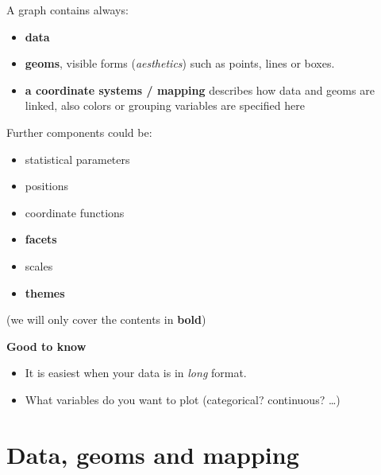 \documentclass[
  letterpaper,
  DIV=11,
  numbers=noendperiod,
  oneside]{scrreprt}
\begin{document}
A graph contains always:

\begin{itemize}
\item
  \textbf{data}
\item
  \textbf{geoms}, visible forms (\emph{aesthetics}) such as points,
  lines or boxes.
\item
  \textbf{a coordinate systems / mapping} describes how data and geoms
  are linked, also colors or grouping variables are specified here
\end{itemize}

Further components could be:

\begin{itemize}
\item
  statistical parameters
\item
  positions
\item
  coordinate functions
\item
  \textbf{facets}
\item
  scales
\item
  \textbf{themes}
\end{itemize}

(we will only cover the contents in \textbf{bold})

\begin{tcolorbox}[enhanced jigsaw, colframe=quarto-callout-tip-color-frame, bottomrule=.15mm, left=2mm, arc=.35mm, toprule=.15mm, opacityback=0, colback=white, rightrule=.15mm, breakable, leftrule=.75mm]
\begin{minipage}[t]{5.5mm}
\textcolor{quarto-callout-tip-color}{\faLightbulb}
\end{minipage}%
\begin{minipage}[t]{\textwidth - 5.5mm}

\textbf{Good to know}\vspace{2mm}

\begin{itemize}
\item
  It is easiest when your data is in \emph{long} format.
\item
  What variables do you want to plot (categorical? continuous? \ldots)
\end{itemize}

\end{minipage}%
\end{tcolorbox}

\hypertarget{data-geoms-and-mapping}{%
\section{Data, geoms and mapping}\label{data-geoms-and-mapping}}
\end{document}

